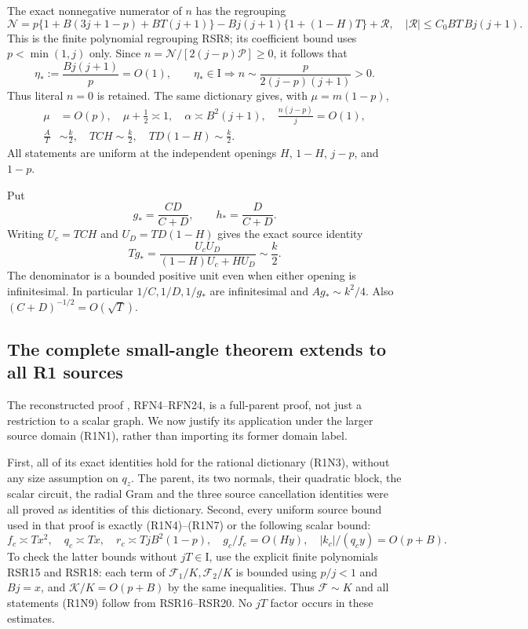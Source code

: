 The exact nonnegative numerator of $n$ has the regrouping
\[
 \mathcal N=p\{1+B(3j+1-p)+BT(j+1)\}
       -Bj(j+1)\{1+(1-H)T\}+\mathcal R ,
 \quad |\mathcal R|\le C_0BT\,Bj(j+1).                   \tag{R1N5}
\]
This is the finite polynomial regrouping RSR8; its coefficient bound
uses $p<\min(1,j)$ only.  Since
$n=\mathcal N/[2(j-p)\mathcal P]\ge0$, it follows that
\[
 \eta_*:=\frac{Bj(j+1)}p=O(1),\qquad
 \eta_*\in\mathrm I
 \Longrightarrow n\sim\frac{p}{2(j-p)(j+1)}>0.           \tag{R1N6}
\]
Thus literal $n=0$ is retained.  The same dictionary gives, with
$\mu=m(1-p)$,
\[
\begin{aligned}
 \mu&=O(p),\quad \mu+\tfrac12\asymp1,\quad
 \alpha\asymp B^2(j+1),\quad \frac{n(j-p)}j=O(1),\\
 \frac AT&\sim\frac k2,\quad
 TCH\sim\frac k2,\quad TD(1-H)\sim\frac k2.
\end{aligned}                                          \tag{R1N7}
\]
All statements are uniform at the independent openings $H$, $1-H$,
$j-p$, and $1-p$.

Put
\[
 g_*=\frac{CD}{C+D},\qquad h_*=\frac D{C+D}.
\]
Writing $U_c=TCH$ and $U_D=TD(1-H)$ gives the exact source identity
\[
 Tg_*=\frac{U_cU_D}{(1-H)U_c+HU_D}\sim\frac k2.          \tag{R1N8}
\]
The denominator is a bounded positive unit even when either opening
is infinitesimal.  In particular
$1/C,1/D,1/g_*$ are infinitesimal and
$Ag_*\sim k^2/4$.  Also $(C+D)^{-1/2}=O(\sqrt T)$.

\subsection{The complete small-angle theorem extends to all R1 sources}

The reconstructed proof , RFN4--RFN24,
is a full-parent proof, not just a restriction to a scalar graph.
We now justify its application under the larger source domain
(R1N1), rather than importing its former domain label.

First, all of its exact identities hold for the rational dictionary
(R1N3), without any size assumption on $q_z$.  The parent, its two
normals, their quadratic block, the scalar circuit, the radial Gram
and the three source cancellation identities were all proved as
identities of this dictionary.  Second, every uniform source bound
used in that proof is exactly (R1N4)--(R1N7) or the following scalar
bound:
\[
 f_c\asymp Tx^2,\quad q_c\asymp Tx,\quad
 r_c\asymp TjB^2(1-p),\quad
 g_c/f_c=O(Hy),\quad |k_c|/(q_cy)=O(p+B).                \tag{R1N9}
\]
To check the latter bounds without $jT\in\mathrm I$, use the explicit
finite polynomials RSR15 and RSR18: each term of
$\mathcal F_1/K,\mathcal F_2/K$ is bounded using $p/j<1$
and $Bj=x$, and $\mathcal K/K=O(p+B)$ by the same inequalities.
Thus $\mathcal F\sim K$ and all statements (R1N9) follow from
RSR16--RSR20.  No $jT$ factor occurs in these estimates.

